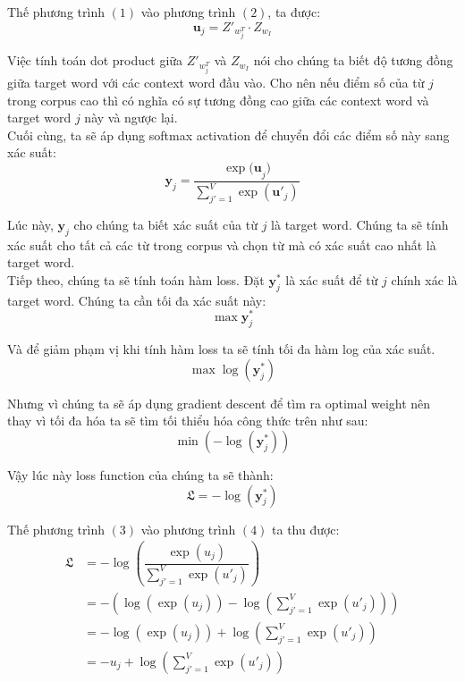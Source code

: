 \documentclass[12pt]{article}
\begin{document}
\indent Thế phương trình $(1)$ vào phương trình $(2)$, ta được:
$$\boldsymbol{u}_j = Z'_{w_j^T} \cdot Z_{w_I}$$

\indent Việc tính toán dot product giữa $Z'_{w_j^T}$ và $Z_{w_I}$ nói cho chúng ta biết độ tương đồng giữa target word với các context word đầu vào. Cho nên nếu điểm số của từ $j$ trong corpus cao thì có nghĩa có sự tương đồng cao giữa các context word và target word $j$ này và ngược lại.\\

\indent Cuối cùng, ta sẽ áp dụng softmax activation để chuyển đổi các điểm số này sang xác suất:
\begin{equation}
  \boldsymbol{y}_j = \dfrac{\exp{(\boldsymbol{u}}_j)}{\sum_{j'=1}^V \exp{(\boldsymbol{u}'_j)}}
\end{equation}

\indent Lúc này, $\boldsymbol{y}_j$ cho chúng ta biết xác suất của từ $j$ là target word. Chúng ta sẽ tính xác suất cho tất cả các từ trong corpus và chọn từ mà có xác suất cao nhất là target word.\\

\indent Tiếp theo, chúng ta sẽ tính toán hàm loss. Đặt $\boldsymbol{y}_j^*$ là xác suất để từ $j$ chính xác là target word. Chúng ta cần tối đa xác suất này:
$$\max{\boldsymbol{y}_j^*}$$

\indent Và để giảm phạm vị khi tính hàm loss ta sẽ tính tối đa hàm log của xác suất.
$$\max{\log{(\boldsymbol{y}_j^*)}}$$

\indent Nhưng vì chúng ta sẽ áp dụng gradient descent để tìm ra optimal weight nên thay vì tối đa hóa ta sẽ tìm tối thiểu hóa công thức trên như sau:
$$\min (-\log{(\boldsymbol{y}_j^*)})$$

\indent Vậy lúc này loss function của chúng ta sẽ thành:
\begin{equation}
  \mathfrak{L} = -\log{(\boldsymbol{y}_j^*)}
\end{equation}

\indent Thế phương trình $(3)$ vào phương trình $(4)$ ta thu được:
\[\begin{aligned}\mathfrak{L} &= - \log{\left ( \dfrac{\exp{(u_j)}}{\sum_{j'=1}^V \exp{(u'_j)}} \right )} \\
   &= - \left ( \log{(\exp{(u_j)})} - \log{\left ( \sum_{j'=1}^V \exp{(u'_j)} \right )} \right ) \\ 
   &= -\log{(\exp{(u_j)})} + \log{\left ( \sum_{j'=1}^V \exp{(u'_j)} \right )} \\
   &= -u_j + \log{\left ( \sum_{j'=1}^V \exp{(u'_j)} \right )}\end{aligned}\]
\end{document}
